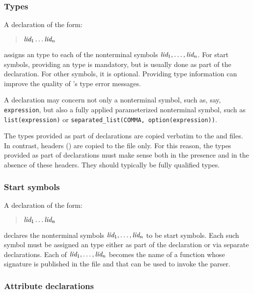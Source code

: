 \documentclass[onecolumn,11pt,nocopyrightspace,preprint]{sigplanconf}
\begin{document}
\subsubsection{Types}
\label{sec:type}

A declaration of the form:
\begin{quote}
\dtype \ocamltype $\textit{lid}_1 \ldots \textit{lid}_n$
\end{quote}
assigns an \ocaml type to each of the nonterminal symbols $\textit{lid}_1, \ldots, \textit{lid}_n$.
For start symbols, providing an \ocaml type is mandatory, but is usually done as part of the
\dstart declaration. For other symbols, it is optional. Providing type information can improve
the quality of \ocaml's type error messages.

A \dtype declaration may concern not only a nonterminal symbol, such as, say,
\texttt{expression}, but also a fully applied parameterized nonterminal
symbol, such as \texttt{list(expression)} or \texttt{separated\_list(COMMA,
  option(expression))}.

The types provided as part of \dtype declarations are copied verbatim to the
\ml and \mli files. In contrast, headers () are copied
to the \ml file only. For this reason, the types provided as part of \dtype
declarations must make sense both in the presence and in the absence of these
headers. They should typically be fully qualified types.


\subsubsection{Start symbols}
\label{sec:start}

A declaration of the form:
\begin{quote}
\dstart \optional{\ocamltype} $\textit{lid}_1 \ldots \textit{lid}_n$
\end{quote}
declares the nonterminal symbols $\textit{lid}_1, \ldots, \textit{lid}_n$ to be
start symbols. Each such symbol must be assigned an \ocaml type either as
part of the \dstart declaration or via separate \dtype declarations. Each
of $\textit{lid}_1, \ldots, \textit{lid}_n$ becomes the name of a function whose
signature is published in the \mli file and that can be used to invoke
the parser.

\subsubsection{Attribute declarations}
\end{document}
